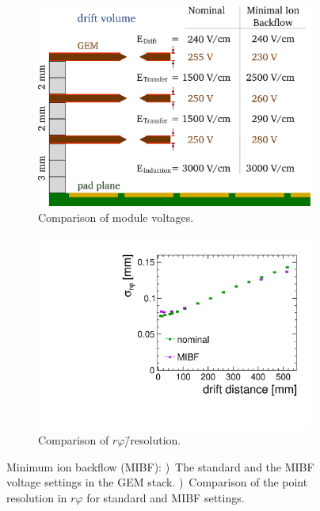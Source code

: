 \begin{figure}
\begin{subfigure}[b]{0.52\textwidth}
\includegraphics[width=\textwidth]{Tracker/TPC_Bonn/plots/TPC-DG_gem-voltages-nominal-mib.pdf}
\caption{Comparison of module voltages.}
\label{sfig:voltages_nom-mib}
\end{subfigure}%
\begin{subfigure}[b]{0.48\textwidth}
\includegraphics[width=\textwidth]{Tracker/TPC_Bonn/plots/TPC-DG_rphiResolution_IBF_v2.pdf}
\caption{Comparison of $r\varphi$\=/resolution.}
\label{sfig:rphires_mibf}
\end{subfigure}
\caption{Minimum ion backflow (MIBF):
  \protect{})~The standard and the MIBF voltage settings in the GEM stack.
  \protect{})~Comparison of the point resolution in $r\varphi$ for standard and MIBF settings.}
\label{fig:mibf}
\end{figure}

